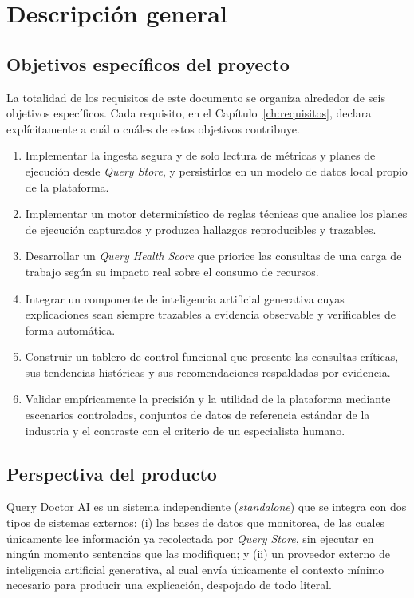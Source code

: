 \documentclass[11pt,a4paper]{report}
\begin{document}
\chapter{Descripci\'on general}
\label{ch:descripcion}

\section{Objetivos espec\'ificos del proyecto}
\label{sec:objetivos}

La totalidad de los requisitos de este documento se organiza alrededor de seis objetivos espec\'ificos. Cada requisito, en el Cap\'itulo~\ref{ch:requisitos}, declara expl\'icitamente a cu\'al o cu\'ales de estos objetivos contribuye.

\begin{enumerate}[label=\textbf{OBJ-\arabic*}]
\item Implementar la ingesta segura y de solo lectura de m\'etricas y planes de ejecuci\'on desde \textit{Query Store}, y persistirlos en un modelo de datos local propio de la plataforma.
\item Implementar un motor determin\'istico de reglas t\'ecnicas que analice los planes de ejecuci\'on capturados y produzca hallazgos reproducibles y trazables.
\item Desarrollar un \textit{Query Health Score} que priorice las consultas de una carga de trabajo seg\'un su impacto real sobre el consumo de recursos.
\item Integrar un componente de inteligencia artificial generativa cuyas explicaciones sean siempre trazables a evidencia observable y verificables de forma autom\'atica.
\item Construir un tablero de control funcional que presente las consultas cr\'iticas, sus tendencias hist\'oricas y sus recomendaciones respaldadas por evidencia.
\item Validar emp\'iricamente la precisi\'on y la utilidad de la plataforma mediante escenarios controlados, conjuntos de datos de referencia est\'andar de la industria y el contraste con el criterio de un especialista humano.
\end{enumerate}

\section{Perspectiva del producto}

Query Doctor AI es un sistema independiente (\textit{standalone}) que se integra con dos tipos de sistemas externos: (i) las bases de datos que monitorea, de las cuales \'unicamente lee informaci\'on ya recolectada por \textit{Query Store}, sin ejecutar en ning\'un momento sentencias que las modifiquen; y (ii) un proveedor externo de inteligencia artificial generativa, al cual env\'ia \'unicamente el contexto m\'inimo necesario para producir una explicaci\'on, despojado de todo literal.
\end{document}
